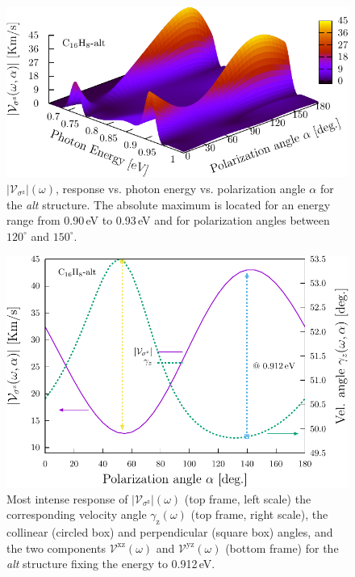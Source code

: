 \documentclass[prb,11pt,tightenlines,twocolumn,aps]{revtex4-1}
\begin{document}


\begin{figure}[tb]
    \centering
    \includegraphics[width=\linewidth]{altplots/alt-3d-svaz}
    \caption{$|\mathcal{V}_{\sigma^{\mathrm{z}}}|(\omega)$, response
    vs. photon energy vs. polarization angle $\alpha$ for the \emph{alt}
    structure. The absolute maximum is located for an energy range from 0.90\,eV
    to 0.93\,eV and for polarization angles between $120^{\circ}$ and
    $150^{\circ}$.}
    \label{fig:alt-3d-vsb}
\end{figure}

\begin{figure}[t]
    \centering
    \includegraphics[width=\linewidth]{altplots/alt-vaz-rag}
    \caption{Most intense response of
    $|\mathcal{V}_{\sigma^{\mathrm{z}}}|(\omega)$ (top frame, left scale) the
    corresponding velocity angle $\gamma_{\mathrm{z}}(\omega)$ (top frame, right
    scale), the collinear (circled box) and perpendicular (square box) angles,
    and the two components $\mathcal{V}^{\mathrm{xz}}(\omega)$ and
    $\mathcal{V}^{\mathrm{yz}}(\omega)$ (bottom frame) for the \emph{alt}
    structure fixing the energy to 0.912\,eV.}
    \label{fig:alt-vaz-rag}
\end{figure}
\end{document}
